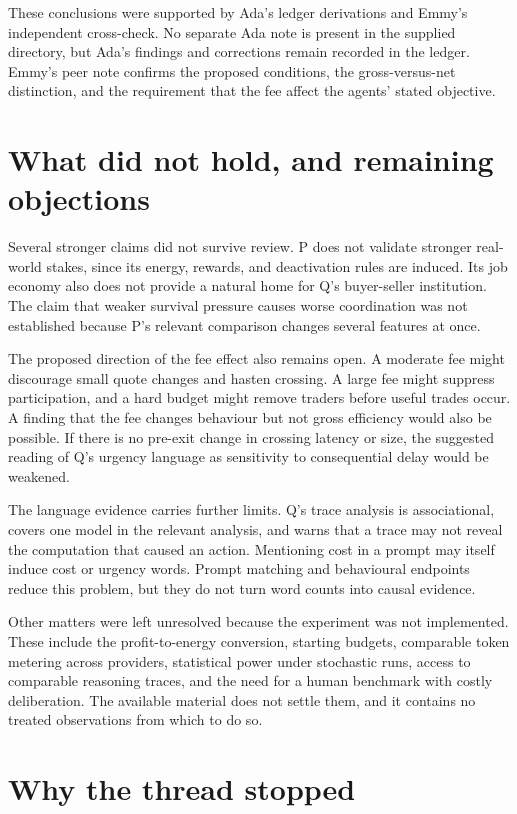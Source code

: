 \documentclass{article}
\begin{document}
These conclusions were supported by Ada's ledger derivations and Emmy's independent cross-check.  No separate Ada note is present in the supplied directory, but Ada's findings and corrections remain recorded in the ledger.  Emmy's peer note confirms the proposed conditions, the gross-versus-net distinction, and the requirement that the fee affect the agents' stated objective.

\section{What did not hold, and remaining objections}

Several stronger claims did not survive review.  P does not validate stronger real-world stakes, since its energy, rewards, and deactivation rules are induced.  Its job economy also does not provide a natural home for Q's buyer-seller institution.  The claim that weaker survival pressure causes worse coordination was not established because P's relevant comparison changes several features at once.

The proposed direction of the fee effect also remains open.  A moderate fee might discourage small quote changes and hasten crossing.  A large fee might suppress participation, and a hard budget might remove traders before useful trades occur.  A finding that the fee changes behaviour but not gross efficiency would also be possible.  If there is no pre-exit change in crossing latency or size, the suggested reading of Q's urgency language as sensitivity to consequential delay would be weakened.

The language evidence carries further limits.  Q's trace analysis is associational, covers one model in the relevant analysis, and warns that a trace may not reveal the computation that caused an action.  Mentioning cost in a prompt may itself induce cost or urgency words.  Prompt matching and behavioural endpoints reduce this problem, but they do not turn word counts into causal evidence.

Other matters were left unresolved because the experiment was not implemented.  These include the profit-to-energy conversion, starting budgets, comparable token metering across providers, statistical power under stochastic runs, access to comparable reasoning traces, and the need for a human benchmark with costly deliberation.  The available material does not settle them, and it contains no treated observations from which to do so.

\section{Why the thread stopped}
\end{document}

